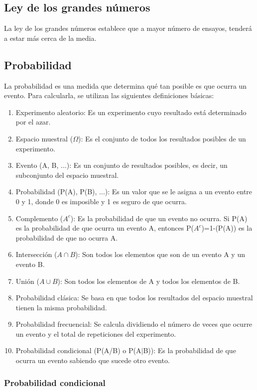 \documentclass[a4paper, 12pt]{book}
\begin{document}
\subsection{Ley de los grandes números}
La ley de los grandes números establece que a mayor número de ensayos, tenderá a estar más cerca de la media.

\subsection{Probabilidad}
La probabilidad es una medida que determina qué tan posible es que ocurra un evento. Para calcularla, se utilizan las siguientes definiciones básicas:
\begin{enumerate}
	\item Experimento aleatorio: Es un experimento cuyo resultado está determinado por el azar.
	\item Espacio muestral ($\Omega$): Es el conjunto de todos los resultados posibles de un experimento.
	\item Evento (A, B, ...): Es un conjunto de resultados posibles, es decir, un subconjunto del espacio muestral.
	\item Probabilidad (P(A), P(B), ...): Es un valor que se le asigna a un evento entre 0 y 1, donde 0 es imposible y 1 es seguro de que ocurra.
	\item Complemento ($A^c$): Es la probabilidad de que un evento no ocurra. Si P(A) es la probabilidad de que ocurra un evento A, entonces P($A^c$)=1-(P(A)) es la probabilidad de que no ocurra A.
	\item Intersección ($A\cap B$): Son todos los elementos que son de un evento A y un evento B.
	\item Unión ($A \cup B$): Son todos los elementos de A y todos los elementos de B.
	\item Probabilidad clásica: Se basa en que todos los resultados del espacio muestral tienen la misma probabilidad.
	\item Probabilidad frecuencial: Se calcula dividiendo el número de veces que ocurre un evento y el total de repeticiones del experimento.
	\item Probabilidad condicional (P(A/B) o P(A$\vert$B)): Es la probabilidad de que ocurra un evento sabiendo que sucede otro evento.
\end{enumerate}

\subsubsection{Probabilidad condicional}
\end{document}
